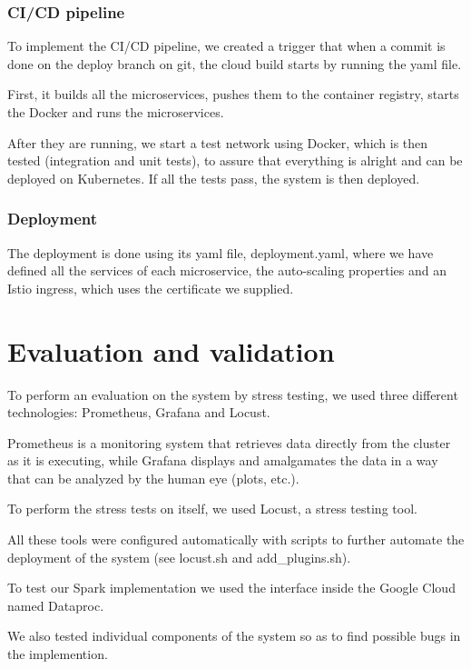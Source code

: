 \documentclass[oneside]{article}
\newcommand*\fpar{\hspace{1ex}}
\begin{document}
    \subsubsection{CI/CD pipeline}
    \fpar To implement the CI/CD pipeline, we created a trigger that when a commit is done on the deploy branch on git, the cloud build starts by running the yaml file. 
    \par First, it builds all the microservices, pushes them to the container registry, starts the Docker and runs the microservices. 
    \par After they are running, we start a test network using Docker, which is then tested (integration and unit tests), to assure that everything is alright and can be deployed on Kubernetes. If all the tests pass, the system is then deployed.

    \subsubsection{Deployment}
    \fpar The deployment is done using its yaml file, deployment.yaml, where we have defined all the services of each microservice, the auto-scaling properties and an Istio ingress, which uses the certificate we supplied.

\section{Evaluation and validation}
\label{sec:evaluation_and_validation}
\fpar To perform an evaluation on the system by stress testing, we used three different technologies: Prometheus, Grafana and Locust. 
\par Prometheus is a monitoring system that retrieves data directly from the cluster as it is executing, while Grafana displays and amalgamates the data in a way that can be analyzed by the human eye (plots, etc.). 
\par To perform the stress tests on itself, we used Locust, a stress testing tool. 
\par All these tools were configured automatically with scripts to further automate the deployment of the system (see locust.sh and add\_plugins.sh).
\par To test our Spark implementation we used the interface inside the Google Cloud named Dataproc.
\par We also tested individual components of the system so as to find possible bugs in the implemention.
\end{document}
